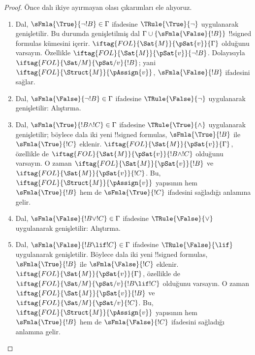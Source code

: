 \documentclass[../../../include/open-logic-section]{subfiles}
\begin{document}
\begin{proof}
Önce dalı ikiye ayırmayan olası çıkarımları ele alıyoruz.
\begin{enumerate}
\item Dal, $\sFmla{\True}{\lnot !B} \in \Gamma$ ifadesine
  $\TRule{\True}{\lnot}$ uygulanarak genişletilir. Bu durumda genişletilmiş
  dal $\Gamma \cup \{\sFmla{\False}{!B}\}$ !!{signed formula}s kümesini
  içerir. $\iftag{FOL}{\Sat{M}}{\pSat{v}}{\Gamma}$ olduğunu varsayın.
  Özellikle $\iftag{FOL}{\Sat{M}}{\pSat{v}}{\lnot !B}$. Dolayısıyla
  $\iftag{FOL}{\Sat/{M}}{\pSat/{v}}{!B}$; yani
  $\iftag{FOL}{\Struct{M}}{\pAssign{v}}$, $\sFmla{\False}{!B}$ ifadesini
  sağlar.
\item Dal, $\sFmla{\False}{\lnot !B} \in \Gamma$ ifadesine
  $\TRule{\False}{\lnot}$ uygulanarak genişletilir: Alıştırma.
\item Dal, $\sFmla{\True}{!B \land !C} \in \Gamma$ ifadesine
  $\TRule{\True}{\land}$ uygulanarak genişletilir; böylece dala iki yeni
  !!{signed formula}s, $\sFmla{\True}{!B}$ ile $\sFmla{\True}{!C}$ eklenir.
  $\iftag{FOL}{\Sat{M}}{\pSat{v}}{\Gamma}$, özellikle de
  $\iftag{FOL}{\Sat{M}}{\pSat{v}}{!B \land !C}$ olduğunu varsayın. O zaman
  $\iftag{FOL}{\Sat{M}}{\pSat{v}}{!B}$ ve
  $\iftag{FOL}{\Sat{M}}{\pSat{v}}{!C}$. Bu,
  $\iftag{FOL}{\Struct{M}}{\pAssign{v}}$ yapısının hem
  $\sFmla{\True}{!B}$ hem de $\sFmla{\True}{!C}$ ifadesini sağladığı
  anlamına gelir.
\item Dal, $\sFmla{\False}{!B \lor !C} \in \Gamma$ ifadesine
  $\TRule{\False}{\lor}$ uygulanarak genişletilir: Alıştırma.
\item Dal, $\sFmla{\False}{!B \lif !C} \in \Gamma$ ifadesine
  $\TRule{\False}{\lif}$ uygulanarak genişletilir. Böylece dala iki yeni
  !!{signed formula}s, $\sFmla{\True}{!B}$ ile $\sFmla{\False}{!C}$ eklenir.
  $\iftag{FOL}{\Sat{M}}{\pSat{v}}{\Gamma}$, özellikle de
  $\iftag{FOL}{\Sat/{M}}{\pSat/{v}}{!B \lif !C}$ olduğunu varsayın. O zaman
  $\iftag{FOL}{\Sat{M}}{\pSat{v}}{!B}$ ve
  $\iftag{FOL}{\Sat/{M}}{\pSat/{v}}{!C}$. Bu,
  $\iftag{FOL}{\Struct{M}}{\pAssign{v}}$ yapısının hem
  $\sFmla{\True}{!B}$ hem de $\sFmla{\False}{!C}$ ifadesini sağladığı
  anlamına gelir.

\end{enumerate}
\end{proof}
\end{document}
